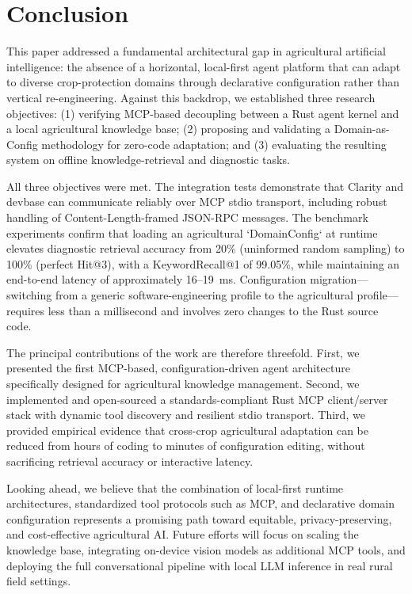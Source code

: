 \section{Conclusion}
\label{sec:conclusion}

This paper addressed a fundamental architectural gap in agricultural artificial intelligence: the absence of a horizontal, local-first agent platform that can adapt to diverse crop-protection domains through declarative configuration rather than vertical re-engineering. Against this backdrop, we established three research objectives: (1) verifying MCP-based decoupling between a Rust agent kernel and a local agricultural knowledge base; (2) proposing and validating a Domain-as-Config methodology for zero-code adaptation; and (3) evaluating the resulting system on offline knowledge-retrieval and diagnostic tasks.

All three objectives were met. The integration tests demonstrate that Clarity and devbase can communicate reliably over MCP stdio transport, including robust handling of Content-Length-framed JSON-RPC messages. The benchmark experiments confirm that loading an agricultural `DomainConfig` at runtime elevates diagnostic retrieval accuracy from 20\% (uninformed random sampling) to 100\% (perfect Hit@3), with a KeywordRecall@1 of 99.05\%, while maintaining an end-to-end latency of approximately 16--19~ms. Configuration migration---switching from a generic software-engineering profile to the agricultural profile---requires less than a millisecond and involves zero changes to the Rust source code.

The principal contributions of the work are therefore threefold. First, we presented the first MCP-based, configuration-driven agent architecture specifically designed for agricultural knowledge management. Second, we implemented and open-sourced a standards-compliant Rust MCP client/server stack with dynamic tool discovery and resilient stdio transport. Third, we provided empirical evidence that cross-crop agricultural adaptation can be reduced from hours of coding to minutes of configuration editing, without sacrificing retrieval accuracy or interactive latency.

Looking ahead, we believe that the combination of local-first runtime architectures, standardized tool protocols such as MCP, and declarative domain configuration represents a promising path toward equitable, privacy-preserving, and cost-effective agricultural AI. Future efforts will focus on scaling the knowledge base, integrating on-device vision models as additional MCP tools, and deploying the full conversational pipeline with local LLM inference in real rural field settings.
